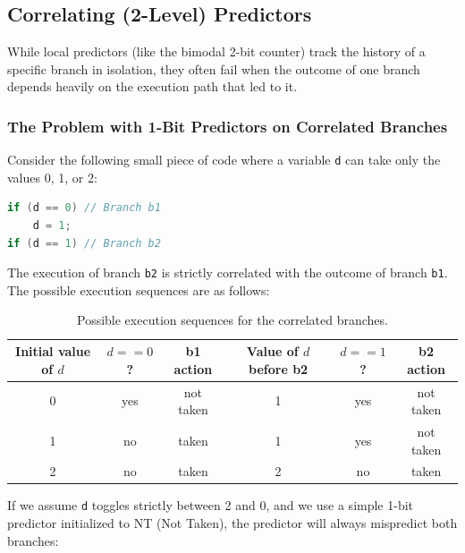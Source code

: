 \subsection{Correlating (2-Level) Predictors}

While local predictors (like the bimodal 2-bit counter) track the history of a specific branch in isolation, they often fail when the outcome of one branch depends heavily on the execution path that led to it. 

\subsubsection{The Problem with 1-Bit Predictors on Correlated Branches}
Consider the following small piece of code where a variable \texttt{d} can take only the values 0, 1, or 2:
\begin{lstlisting}[language=C]
if (d == 0) // Branch b1
    d = 1;
if (d == 1) // Branch b2
\end{lstlisting}

The execution of branch \texttt{b2} is strictly correlated with the outcome of branch \texttt{b1}. The possible execution sequences are as follows:

\begin{table}[htpb]
    \centering
    \renewcommand{\arraystretch}{1.2}
    \begin{tabular}{c c c c c c}
        \textbf{Initial value of \(d\)} & \textbf{\(d==0\)?} & \textbf{b1 action} & \textbf{Value of \(d\) before b2} & \textbf{\(d==1\)?} & \textbf{b2 action} \\
        \hline
        0 & yes & not taken & 1 & yes & not taken \\
        1 & no  & taken     & 1 & yes & not taken \\
        2 & no  & taken     & 2 & no  & taken \\
        \hline
    \end{tabular}
    \caption{Possible execution sequences for the correlated branches.}
    \label{tab:correlated-execution}
\end{table}

If we assume \texttt{d} toggles strictly between 2 and 0, and we use a simple 1-bit predictor initialized to NT (Not Taken), the predictor will always mispredict both branches:


